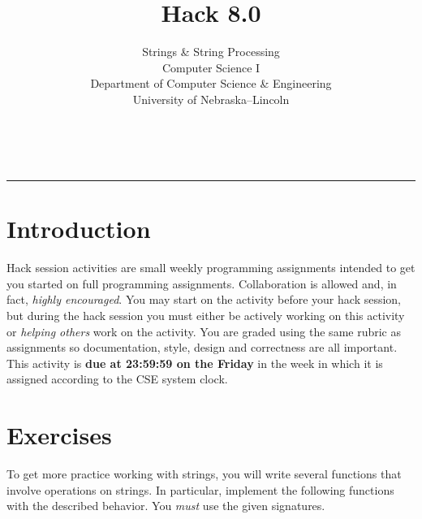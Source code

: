 \documentclass[12pt]{scrartcl}
\title{Hack 8.0}\let\Title\@title
\subtitle{Strings \& String Processing\\
Computer Science I\\
{\small
\vskip1cm
Department of Computer Science \& Engineering \\
University of Nebraska--Lincoln}
\vskip-1cm}
\date{~}
\begin{document}
\maketitle

\hrule

\section*{Introduction}

Hack session activities are small weekly programming assignments intended
to get you started on full programming assignments.  Collaboration is allowed
and, in fact, \emph{highly encouraged}.  You may start on the activity before
your hack session, but during the hack session you must either be actively 
working on this activity or \emph{helping others} work on the activity.
You are graded using the same rubric as assignments so documentation, style, 
design and correctness are all important.  This activity is \textbf{due 
at 23:59:59 on the Friday} in the week in which it is assigned according 
to the CSE system clock.

\section*{Exercises}

To get more practice working with strings, you will write several 
functions that involve operations on strings.  In particular, implement
the following functions with the described behavior.  You \emph{must}
use the given signatures.
\end{document}
